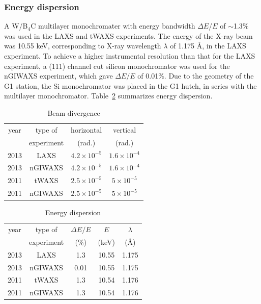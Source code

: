 \subsubsection{Energy dispersion}\label{sec:energy_dispersion}
A W/B$_4$C multilayer monochromater with energy bandwidth $\Delta E$/$E$ of
$\sim$1.3\% was used in the LAXS and tWAXS experiments. 
The energy of the X-ray beam was 10.55 keV, corresponding to X-ray wavelength 
$\lambda$ of 1.175 \AA, in the LAXS experiment.
To achieve a higher instrumental resolution than that for 
the LAXS experiment, a (111) channel cut silicon monochromator was used for 
the nGIWAXS experiment, which gave $\Delta E/E$ of 0.01\%.
Due to the geometry of the G1 station, the Si monochromator was placed in
the G1 hutch, in series with the multilayer monochromator. 
Table~\ref{tab:energy_dispersion} summarizes energy dispersion.

\begin{table}[htbp]
  \centering
  \begin{tabular}{cccc}
    \hline
    year & type of  & horizontal & vertical \\
     & experiment & (rad.) & (rad.) \\
    \hline
    2013 & LAXS & $4.2 \times 10^{-5}$ & $1.6 \times 10^{-4}$ \\
    2013 & nGIWAXS & $4.2 \times 10^{-5}$ & $1.6 \times 10^{-4}$ \\
    2011 & tWAXS & $2.5 \times 10^{-5}$ & $5 \times 10^{-5}$ \\
    2011 & nGIWAXS & $2.5 \times 10^{-5}$ & $5 \times 10^{-5}$ \\
    \hline
  \end{tabular}
  \caption[Beam divergence]{Beam divergence}
  \label{tab:beam_divergence}
\end{table}

\begin{table}[htbp]
  \centering
  \begin{tabular}{ccccc}
    \hline
    year & type of & $\Delta E/E$ & $E$ & $\lambda$ \\
     & experiment & (\%) & (keV) & (\AA) \\
    \hline
    2013 & LAXS & 1.3 & 10.55 & 1.175 \\
    2013 & nGIWAXS & 0.01 & 10.55 & 1.175 \\
    2011 & tWAXS & 1.3 & 10.54 & 1.176 \\
    2011 & nGIWAXS & 1.3 & 10.54 & 1.176 \\
    \hline
  \end{tabular}
  \caption[Energy dispersion]{Energy dispersion}
  \label{tab:energy_dispersion}
\end{table}

